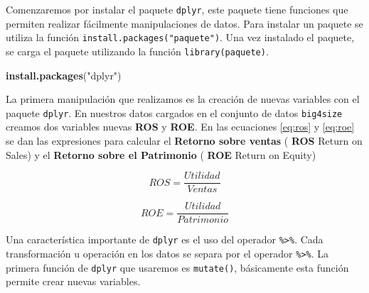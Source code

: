\documentclass[letterpaper,]{book}
\newenvironment{Shaded}{\begin{snugshade}}{\end{snugshade}}
\newcommand{\DataTypeTok}[1]{\textcolor[rgb]{0.13,0.29,0.53}{#1}}
\newcommand{\KeywordTok}[1]{\textcolor[rgb]{0.13,0.29,0.53}{\textbf{#1}}}
\newcommand{\NormalTok}[1]{#1}
\newcommand{\OperatorTok}[1]{\textcolor[rgb]{0.81,0.36,0.00}{\textbf{#1}}}
\newcommand{\StringTok}[1]{\textcolor[rgb]{0.31,0.60,0.02}{#1}}
\begin{document}
Comenzaremos por instalar el paquete \texttt{dplyr}, este paquete tiene funciones que permiten realizar fácilmente manipulaciones de datos. Para instalar un paquete se utiliza la función \texttt{install.packages("paquete")}. Una vez instalado el paquete, se carga el paquete utilizando la función \texttt{library(paquete)}.

\begin{Shaded}
\begin{Highlighting}[]
\KeywordTok{install.packages}\NormalTok{(}\StringTok{"dplyr"}\NormalTok{)}
\end{Highlighting}
\end{Shaded}

La primera manipulación que realizamos es la creación de nuevas variables con el paquete \texttt{dplyr}. En nuestros datos cargados en el conjunto de datos \texttt{big4size} creamos dos variables nuevas \textbf{ROS} y \textbf{ROE}. En las ecuaciones \eqref{eq:ros} y \eqref{eq:roe} se dan las expresiones para calcular el \textbf{Retorno sobre ventas} ( \textbf{ROS} Return on Sales) y el \textbf{Retorno sobre el Patrimonio} ( \textbf{ROE} Return on Equity)

\begin{equation} 
  ROS = \dfrac{Utilidad}{Ventas}
  \label{eq:ros}
\end{equation}

\begin{equation} 
  ROE = \dfrac{Utilidad}{Patrimonio}
  \label{eq:roe}
\end{equation}

Una característica importante de \texttt{dplyr} es el uso del operador \texttt{\%\textgreater{}\%}. Cada transformación u operación en los datos se separa por el operador \texttt{\%\textgreater{}\%}. La primera función de \texttt{dplyr} que usaremos es \texttt{mutate()}, básicamente esta función permite crear nuevas variables.

\begin{Shaded}
\end{Shaded}
\end{document}
